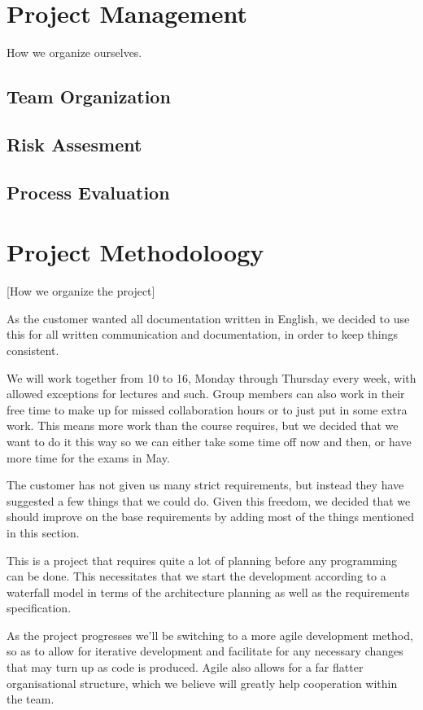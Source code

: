 \documentclass[12pt]{article}
\begin{document}
\section{Project Management}\label{management} How we organize ourselves. 
    \subsection{Team Organization}\label{team}
    \subsection{Risk Assesment}\label{risk}
    \subsection{Process Evaluation}\label{processevaluation}
\section{Project Methodoloogy}\label{methodology} [How we organize the project]

    As the customer wanted all documentation written in English, we decided to use this for all written communication and documentation, in order to keep things consistent.

    We will work together from 10 to 16, Monday through Thursday every week, with allowed exceptions for lectures and such. Group members can also work in their free time to make up for missed collaboration hours or to just put in some extra work. This means more work than the course requires, but we decided that we want to do it this way so we can either take some time off now and then, or have more time for the exams in May.

    The customer has not given us many strict requirements, but instead they have suggested a few things that we could do. Given this freedom, we decided that we should improve on the base requirements by adding most of the things mentioned in this section.

    This is a project that requires quite a lot of planning before any programming can be done. This necessitates that we start the development according to a waterfall model in terms of the architecture planning as well as the requirements specification.
    
    As the project progresses we’ll be switching to a more agile development method, so as to allow for iterative development and facilitate for any necessary changes that may turn up as code is produced. Agile also allows for a far flatter organisational structure, which we believe will greatly help cooperation within the team.
    
\end{document}
